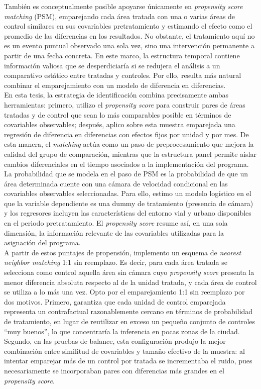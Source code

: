 También es conceptualmente posible apoyarse únicamente en \emph{propensity score matching} (PSM), emparejando cada área tratada con una o varias áreas de control similares en sus covariables pretratamiento y estimando el efecto como el promedio de las diferencias en los resultados. No obstante, el tratamiento aquí no es un evento puntual observado una sola vez, sino una intervención permanente a partir de una fecha concreta. En este marco, la estructura temporal contiene información valiosa que se desperdiciaría si se redujera el análisis a un comparativo estático entre tratadas y controles. Por ello, resulta más natural combinar el emparejamiento con un modelo de diferencia en diferencias.\\

En esta tesis, la estrategia de identificación combina precisamente ambas herramientas: primero, utilizo el \emph{propensity score} para construir pares de áreas tratadas y de control que sean lo más comparables posible en términos de covariables observables; después, aplico sobre esta muestra emparejada una regresión de diferencia en diferencias con efectos fijos por unidad y por mes. De esta manera, el \emph{matching} actúa como un paso de preprocesamiento que mejora la calidad del grupo de comparación, mientras que la estructura panel permite aislar cambios diferenciales en el tiempo asociados a la implementación del programa.\\

La probabilidad que se modela en el paso de PSM es la probabilidad de que un área determinada cuente con una cámara de velocidad condicional en las covariables observables seleccionadas. Para ello, estimo un modelo logístico en el que la variable dependiente es una dummy de tratamiento (presencia de cámara) y los regresores incluyen las características del entorno vial y urbano disponibles en el periodo pretratamiento. El \emph{propensity score} resume así, en una sola dimensión, la información relevante de las covariables utilizadas para la asignación del programa.\\

A partir de estos puntajes de propensión, implemento un esquema de \emph{nearest neighbor matching} 1:1 sin reemplazo. Es decir, para cada área tratada se selecciona como control aquella área sin cámara cuyo \emph{propensity score} presenta la menor diferencia absoluta respecto al de la unidad tratada, y cada área de control se utiliza a lo más una vez. Opto por el emparejamiento 1:1 sin reemplazo por dos motivos. Primero, garantiza que cada unidad de control emparejada representa un contrafactual razonablemente cercano en términos de probabilidad de tratamiento, en lugar de reutilizar en exceso un pequeño conjunto de controles “muy buenos”, lo que concentraría la inferencia en pocas zonas de la ciudad. Segundo, en las pruebas de balance, esta configuración produjo la mejor combinación entre similitud de covariables y tamaño efectivo de la muestra: al intentar emparejar más de un control por tratada se incrementaba el ruido, pues necesariamente se incorporaban pares con diferencias más grandes en el \emph{propensity score}.\\

